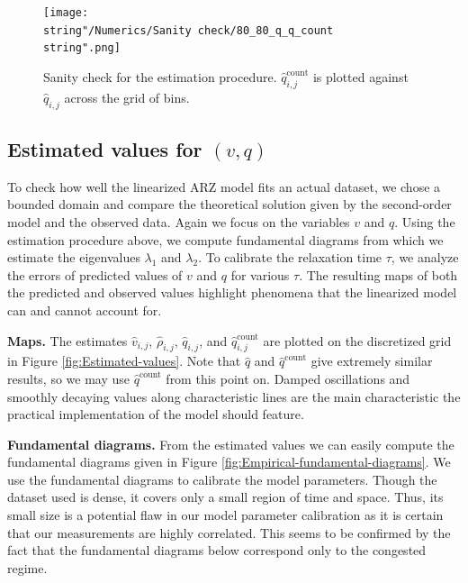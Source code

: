 \documentclass[preprint]{elsarticle}
\begin{document}
\begin{figure}[H]
\centering
\texttt{[image: \\string"/Numerics/Sanity check/80\_80\_q\_q\_count\\string".png]}
\protect\caption{Sanity check for the estimation procedure. $\widehat{q}_{i,j}^{\text{count}}$
is plotted against $\widehat{q}_{i,j}$ across the grid of bins.
\label{fig:Sanity-check}}
\end{figure}



\subsection{Estimated values for $\left(v,q\right)$} 

To check how well the linearized ARZ model fits an actual dataset, we chose a bounded domain and compare the theoretical solution given by the second-order model and the observed data. Again we focus on the variables $v$ and $q$. Using the estimation procedure above, we compute fundamental diagrams from which we estimate the eigenvalues $\lambda_{1}$ and $\lambda_{2}$.
To calibrate the relaxation time $\tau$, we analyze the errors of predicted values of $v$ and $q$ for various $\tau$. The resulting maps of both the predicted and observed values highlight phenomena that the linearized model can and cannot account for. 

\textbf{Maps.} The estimates $\widehat{v}_{i,j}$, $\widehat{\rho}_{i,j}$, $\widehat{q}_{i,j}$, and $\widehat{q}_{i,j}^{\text{count}}$ are plotted on the discretized grid in Figure \ref{fig:Estimated-values}. Note that $\widehat{q}$ and $\widehat{q}^{\text{count}}$ give extremely similar results, so we may use $\widehat{q}^{\text{count}}$ from this point on. Damped oscillations and smoothly decaying values along characteristic lines are the main characteristic the practical implementation of the model should feature.

\textbf{Fundamental diagrams.} From the estimated values we can easily compute the fundamental diagrams given in Figure \ref{fig:Empirical-fundamental-diagrams}. We use the fundamental diagrams to calibrate the model parameters. Though the dataset used is dense, it covers only a small region of time and space. Thus, its small size is a potential flaw in our model parameter calibration as it is certain that
our measurements are highly correlated. This seems
to be confirmed by the fact that the fundamental diagrams below correspond only to the congested regime. \
\end{document}
